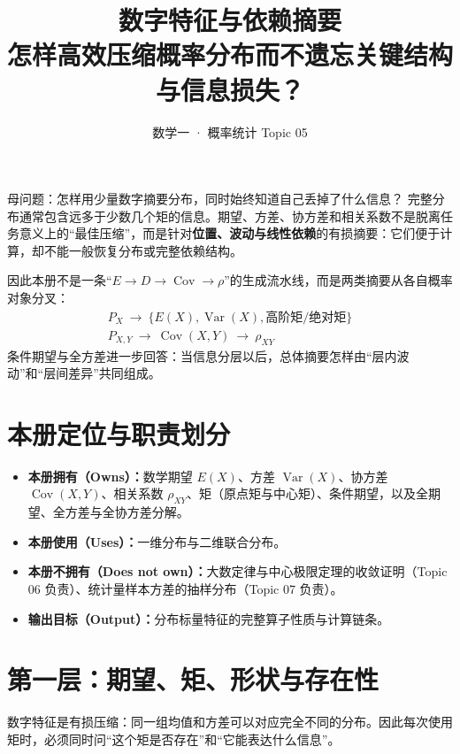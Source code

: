 \documentclass[11pt,a4paper]{ctexart}
\title{\vspace{-1.1cm}\textbf{数字特征与依赖摘要}\\[0.4em]
\large 怎样高效压缩概率分布而不遗忘关键结构与信息损失？}
\author{数学一 · 概率统计 Topic 05}
\date{}
\newcommand{\kw}[1]{\textbf{\color{deep}#1}}
\begin{document}
\maketitle

\begin{corebox}{母问题：怎样用少量数字摘要分布，同时始终知道自己丢掉了什么信息？}
完整分布通常包含远多于少数几个矩的信息。期望、方差、协方差和相关系数不是脱离任务意义上的“最佳压缩”，而是针对\textbf{位置、波动与线性依赖}的有损摘要：它们便于计算，却不能一般恢复分布或完整依赖结构。

因此本册不是一条“$E\to D\to\operatorname{Cov}\to\rho$”的生成流水线，而是两类摘要从各自概率对象分叉：
\[
\boxed{
\begin{array}{c}
P_X\ \longrightarrow\ \{E(X),\operatorname{Var}(X),\text{高阶矩/绝对矩}\}\\[0.5em]
P_{X,Y}\ \longrightarrow\ \operatorname{Cov}(X,Y)\ \longrightarrow\ \rho_{XY}
\end{array}}
\]
条件期望与全方差进一步回答：当信息分层以后，总体摘要怎样由“层内波动”和“层间差异”共同组成。
\end{corebox}

\section{本册定位与职责划分}

\begin{itemize}
  \item \kw{本册拥有（Owns）：}数学期望 $E(X)$、方差 $\operatorname{Var}(X)$、协方差 $\operatorname{Cov}(X,Y)$、相关系数 $\rho_{XY}$、矩（原点矩与中心矩）、条件期望，以及全期望、全方差与全协方差分解。
  \item \kw{本册使用（Uses）：}一维分布与二维联合分布。
  \item \kw{本册不拥有（Does not own）：}大数定律与中心极限定理的收敛证明（Topic 06 负责）、统计量样本方差的抽样分布（Topic 07 负责）。
  \item \kw{输出目标（Output）：}分布标量特征的完整算子性质与计算链条。
\end{itemize}

\section{第一层：期望、矩、形状与存在性}

数字特征是有损压缩：同一组均值和方差可以对应完全不同的分布。因此每次使用矩时，必须同时问“这个矩是否存在”和“它能表达什么信息”。
\end{document}
